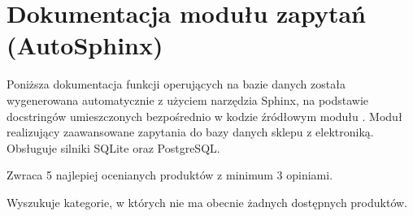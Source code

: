 \documentclass[letterpaper,10pt,polish]{sphinxmanual}
\begin{document}
\section{Dokumentacja modułu zapytań (Auto\sphinxhyphen{}Sphinx)}
\label{\detokenize{rozdzia_u0142_5/BD_Zapytania/index:dokumentacja-modulu-zapytan-auto-sphinx}}
\sphinxAtStartPar
Poniższa dokumentacja funkcji operujących na bazie danych została wygenerowana automatycznie z użyciem narzędzia Sphinx, na podstawie docstringów umieszczonych bezpośrednio w kodzie źródłowym modułu .
\label{\detokenize{rozdzia_u0142_5/BD_Zapytania/index:module-db_queries}}
\sphinxAtStartPar
Moduł realizujący zaawansowane zapytania do bazy danych sklepu z elektroniką.
Obsługuje silniki SQLite oraz PostgreSQL.

\begin{fulllineitems}
\label{\detokenize{rozdzia_u0142_5/BD_Zapytania/index:db_queries.get_best_reviewed_products_pg}}
\pysigstartsignatures
{}
\pysigstopsignatures
\sphinxAtStartPar
Zwraca 5 najlepiej ocenianych produktów z minimum 3 opiniami.

\end{fulllineitems}


\begin{fulllineitems}
\label{\detokenize{rozdzia_u0142_5/BD_Zapytania/index:db_queries.get_categories_without_stock_sqlite}}
\pysigstartsignatures
{}
\pysigstopsignatures
\sphinxAtStartPar
Wyszukuje kategorie, w których nie ma obecnie żadnych dostępnych produktów.

\end{fulllineitems}

\end{document}
